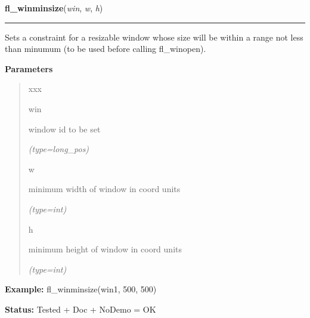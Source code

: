 \hspace{.8\funcindent}\begin{boxedminipage}{\funcwidth}

    \raggedright \textbf{fl\_winminsize}(\textit{win}, \textit{w}, \textit{h})

    \vspace{-1.5ex}

    \rule{\textwidth}{0.5\fboxrule}
\setlength{\parskip}{2ex}
    Sets a constraint for a resizable window whose size will be within a 
    range not less than minumum (to be used before calling fl\_winopen).

\setlength{\parskip}{1ex}
      \textbf{Parameters}
      \vspace{-1ex}

      \begin{quote}
        \begin{Ventry}{xxx}

          \item[win]

          window id to be set

            {\it (type=long\_pos)}

          \item[w]

          minimum width of window in coord units

            {\it (type=int)}

          \item[h]

          minimum height of window in coord units

            {\it (type=int)}

        \end{Ventry}

      \end{quote}

\textbf{Example:} fl\_winminsize(win1, 500, 500)



\textbf{Status:} Tested + Doc + NoDemo = OK



    \end{boxedminipage}

    \label{xformslib:flxbasic:fl_winmaxsize}

    \vspace{0.5ex}

